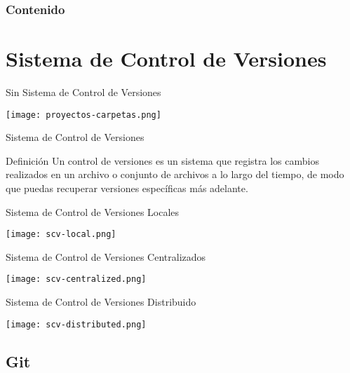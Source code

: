 \begin{frame}
    \frametitle{Contenido}
    \tableofcontents
\end{frame}

\section{Sistema de Control de Versiones}

\begin{frame}[c]{Sin Sistema de Control de Versiones}
    \begin{center}
        \texttt{[image: proyectos-carpetas.png]}
    \end{center}
\end{frame}

\begin{frame}[c]{Sistema de Control de Versiones}
    \begin{block}{Definición}
        Un control de versiones es un sistema que registra los cambios
        realizados en un archivo o conjunto de archivos a lo largo del
        tiempo, de modo que puedas recuperar versiones específicas más
        adelante.
    \end{block}

\end{frame}

\begin{frame}[c]{Sistema de Control de Versiones Locales}
    \begin{center}
        \texttt{[image: scv-local.png]}
    \end{center}
\end{frame}

\begin{frame}[c]{Sistema de Control de Versiones Centralizados}
    \begin{center}
        \texttt{[image: scv-centralized.png]}
    \end{center}
\end{frame}

\begin{frame}[c]{Sistema de Control de Versiones Distribuido}
    \begin{center}
        \texttt{[image: scv-distributed.png]}
    \end{center}
\end{frame}

\subsection{Git}

